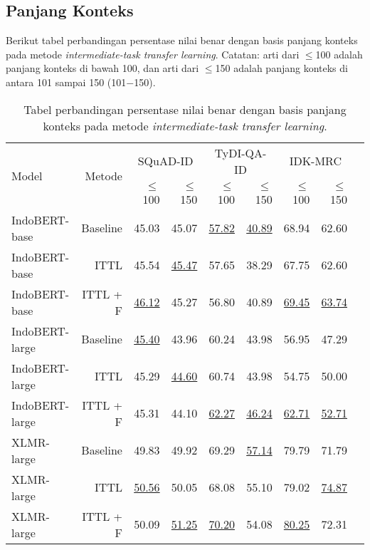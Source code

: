 \subsection{Panjang Konteks}
Berikut tabel perbandingan persentase nilai benar dengan basis panjang konteks pada metode \emph{intermediate-task transfer learning}. Catatan: arti dari $\leq$100 adalah panjang konteks di bawah 100, dan arti dari $\leq$150 adalah panjang konteks di antara 101 sampai 150 (101$-$150).

\begin{table}[H]\centering
\begin{tabular}{lrrrrrrrr}\toprule
\multirow{2}{*}{Model} &\multirow{2}{*}{Metode} &\multicolumn{2}{c}{SQuAD-ID} &\multicolumn{2}{c}{TyDI-QA-ID} &\multicolumn{2}{c}{IDK-MRC} \\\cmidrule{3-8}
& &$\leq$100 &$\leq$150 &$\leq$100 &$\leq$150 &$\leq$100 &$\leq$150 \\\midrule
IndoBERT-base &Baseline &45.03 &45.07 &\underline{57.82} &\underline{40.89} &68.94 &62.60 \\
IndoBERT-base &ITTL &45.54 &\underline{45.47} &57.65 &38.29 &67.75 &62.60 \\
IndoBERT-base &ITTL + F &\underline{46.12} &45.27 &56.80 &40.89 &\underline{69.45} &\underline{63.74} \\
\hline
IndoBERT-large &Baseline &\underline{45.40} &43.96 &60.24 &43.98 &56.95 &47.29 \\
IndoBERT-large &ITTL &45.29 &\underline{44.60} &60.74 &43.98 &54.75 &50.00 \\
IndoBERT-large &ITTL + F &45.31 &44.10 &\underline{62.27} &\underline{46.24} &\underline{62.71} &\underline{52.71} \\
\hline
XLMR-large &Baseline &49.83 &49.92 &69.29 &\underline{57.14} &79.79 &71.79 \\
XLMR-large &ITTL &\underline{50.56} &50.05 &68.08 &55.10 &79.02 &\underline{74.87} \\
XLMR-large &ITTL + F &50.09 &\underline{51.25} &\underline{70.20} &54.08 &\underline{80.25} &72.31 \\
\bottomrule
\end{tabular}
\caption{Tabel perbandingan persentase nilai benar dengan basis panjang konteks pada metode \emph{intermediate-task transfer learning}.}
\end{table}


